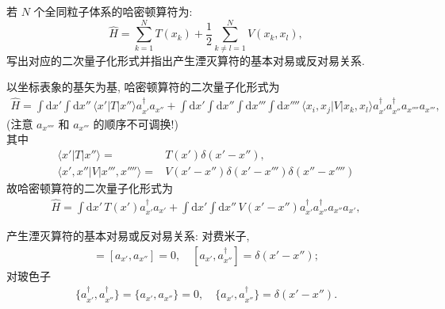 \documentclass{assignment}
\begin{document}
\begin{prob}
    若 $N$ 个全同粒子体系的哈密顿算符为:
    \[
        \hat{H}=\sum_{k=1}^NT(x_k)+\frac{1}{2}\sum_{k\neq l=1}^NV(x_k,x_l),
    \]
    写出对应的二次量子化形式并指出产生湮灭算符的基本对易或反对易关系.
\end{prob}
\begin{sol}
    以坐标表象的基矢为基, 哈密顿算符的二次量子化形式为
    \begin{align}
        \hat{H}=\int\mathrm{d}x'\int\mathrm{d}x''\,\langle x'\rvert T\lvert x''\rangle a_{x'}^{\dagger}a_{x''}+\int\mathrm{d}x'\int\mathrm{d}x''\int\mathrm{d}x'''\int\mathrm{d}x''''\,\langle x_i,x_j\rvert V\lvert x_k,x_l\rangle a_{x'}^{\dagger}a_{x''}^{\dagger}a_{x''''}a_{x'''},
    \end{align}
    (注意 $a_{x''''}$ 和 $a_{x'''}$ 的顺序不可调换!)\\
    其中
    \begin{align}
        \langle x'\rvert T\lvert x''\rangle=&T(x')\delta(x'-x''),\\
        \langle x',x''\rvert V\lvert x''',x''''\rangle=&V(x'-x'')\delta(x'-x''')\delta(x''-x'''')
    \end{align}
    故哈密顿算符的二次量子化形式为
    \begin{align}
        \hat{H}=\int\mathrm{d}x'\,T(x')a_{x'}^{\dagger}a_{x'}+\int\mathrm{d}x'\int\mathrm{d}x''\,V(x'-x'')a_{x'}^{\dagger}a_{x''}^{\dagger}a_{x''}a_{x'},
    \end{align}

    产生湮灭算符的基本对易或反对易关系: 对费米子,
    \begin{align}
        [a_{x'}^{\dagger},a_{x''}^{\dagger}]=[a_{x'},a_{x''}]=0,\quad[a_{x'},a_{x''}^{\dagger}]=\delta(x'-x'');
    \end{align}
    对玻色子
    \begin{align}
        \{a_{x'}^{\dagger},a_{x''}^{\dagger}\}=\{a_{x'},a_{x''}\}=0,\quad\{a_{x'},a_{x''}^{\dagger}\}=\delta(x'-x'').
    \end{align}
\end{sol}
\end{document}
